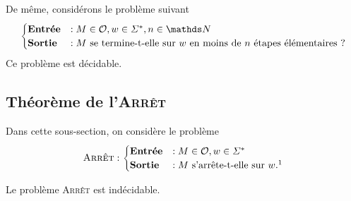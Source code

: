 De même, considérons le problème suivant \[
	\begin{cases}
		\text{\textbf{Entrée}} &: M \in \mathscr{O}, w \in \Sigma^*, n \in \N\\
		\text{\textbf{Sortie}} &: M \text{ se termine-t-elle sur $w$\/ en moins de $n$\/ étapes élémentaires ?}
	\end{cases}
\] Ce problème est décidable.

\subsection{Théorème de l'\textsc{Arrêt}}

Dans cette sous-section, on considère le problème \[
	\text{\textsc{Arrêt}} : \begin{cases}
		\text{\textbf{Entrée}}&: M \in \mathscr{O}, w \in \Sigma^*\\
		\text{\textbf{Sortie}} &: M \text{ s'arrête-t-elle sur } w.\text{\footnotemark}
	\end{cases}
\] 

\begin{thm}
	Le problème \textsc{Arrêt} est indécidable.
\end{thm}

